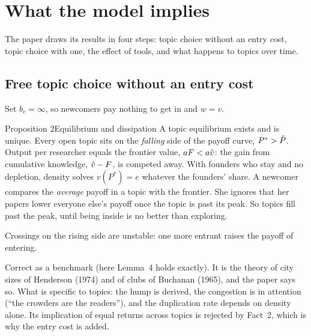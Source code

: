 \section{What the model implies}\label{sec:results}

The paper draws its results in four steps: topic choice without an entry cost, topic choice with one, the effect of tools, and what happens to topics over time.

\subsection{Free topic choice without an entry cost}

Set $b_c=\infty$, so newcomers pay nothing to get in and $w=v$.

\begin{resultbox}{Proposition 2}{Equilibrium and dissipation}{\tsolid}
A topic equilibrium exists and is unique. Every open topic sits on the \emph{falling} side of the payoff curve, $P^*>\hat P$. Output per researcher equals the frontier value, $aF<a\hat v$: the gain from cumulative knowledge, $\hat v-F$, is competed away. With founders who stay and no depletion, density solves $v(P^*)=e$ whatever the founders' share.
\tcblower
\inwords A newcomer compares the \emph{average} payoff in a topic with the frontier. She ignores that her papers lower everyone else's payoff once the topic is past its peak. So topics fill past the peak, until being inside is no better than exploring.

\why Crossings on the rising side are unstable: one more entrant raises the payoff of entering.

\review Correct as a benchmark (here Lemma~4 holds exactly). It is the theory of city sizes of Henderson (1974) and of clubs of Buchanan (1965), and the paper says so. What is specific to topics: the hump is derived, the congestion is in attention (``the crowders are the readers''), and the duplication rate depends on density alone. Its implication of equal returns across topics is rejected by Fact~2, which is why the entry cost is added.
\end{resultbox}

